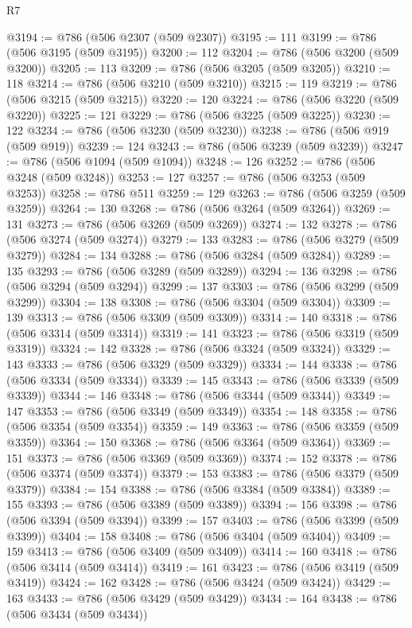 \begin{lexlean}{R7}
\begin{coremodule}
@3194 := @786 (@506 @2307 (@509 @2307))
@3195 := 111
@3199 := @786 (@506 @3195 (@509 @3195))
@3200 := 112
@3204 := @786 (@506 @3200 (@509 @3200))
@3205 := 113
@3209 := @786 (@506 @3205 (@509 @3205))
@3210 := 118
@3214 := @786 (@506 @3210 (@509 @3210))
@3215 := 119
@3219 := @786 (@506 @3215 (@509 @3215))
@3220 := 120
@3224 := @786 (@506 @3220 (@509 @3220))
@3225 := 121
@3229 := @786 (@506 @3225 (@509 @3225))
@3230 := 122
@3234 := @786 (@506 @3230 (@509 @3230))
@3238 := @786 (@506 @919 (@509 @919))
@3239 := 124
@3243 := @786 (@506 @3239 (@509 @3239))
@3247 := @786 (@506 @1094 (@509 @1094))
@3248 := 126
@3252 := @786 (@506 @3248 (@509 @3248))
@3253 := 127
@3257 := @786 (@506 @3253 (@509 @3253))
@3258 := @786 @511
@3259 := 129
@3263 := @786 (@506 @3259 (@509 @3259))
@3264 := 130
@3268 := @786 (@506 @3264 (@509 @3264))
@3269 := 131
@3273 := @786 (@506 @3269 (@509 @3269))
@3274 := 132
@3278 := @786 (@506 @3274 (@509 @3274))
@3279 := 133
@3283 := @786 (@506 @3279 (@509 @3279))
@3284 := 134
@3288 := @786 (@506 @3284 (@509 @3284))
@3289 := 135
@3293 := @786 (@506 @3289 (@509 @3289))
@3294 := 136
@3298 := @786 (@506 @3294 (@509 @3294))
@3299 := 137
@3303 := @786 (@506 @3299 (@509 @3299))
@3304 := 138
@3308 := @786 (@506 @3304 (@509 @3304))
@3309 := 139
@3313 := @786 (@506 @3309 (@509 @3309))
@3314 := 140
@3318 := @786 (@506 @3314 (@509 @3314))
@3319 := 141
@3323 := @786 (@506 @3319 (@509 @3319))
@3324 := 142
@3328 := @786 (@506 @3324 (@509 @3324))
@3329 := 143
@3333 := @786 (@506 @3329 (@509 @3329))
@3334 := 144
@3338 := @786 (@506 @3334 (@509 @3334))
@3339 := 145
@3343 := @786 (@506 @3339 (@509 @3339))
@3344 := 146
@3348 := @786 (@506 @3344 (@509 @3344))
@3349 := 147
@3353 := @786 (@506 @3349 (@509 @3349))
@3354 := 148
@3358 := @786 (@506 @3354 (@509 @3354))
@3359 := 149
@3363 := @786 (@506 @3359 (@509 @3359))
@3364 := 150
@3368 := @786 (@506 @3364 (@509 @3364))
@3369 := 151
@3373 := @786 (@506 @3369 (@509 @3369))
@3374 := 152
@3378 := @786 (@506 @3374 (@509 @3374))
@3379 := 153
@3383 := @786 (@506 @3379 (@509 @3379))
@3384 := 154
@3388 := @786 (@506 @3384 (@509 @3384))
@3389 := 155
@3393 := @786 (@506 @3389 (@509 @3389))
@3394 := 156
@3398 := @786 (@506 @3394 (@509 @3394))
@3399 := 157
@3403 := @786 (@506 @3399 (@509 @3399))
@3404 := 158
@3408 := @786 (@506 @3404 (@509 @3404))
@3409 := 159
@3413 := @786 (@506 @3409 (@509 @3409))
@3414 := 160
@3418 := @786 (@506 @3414 (@509 @3414))
@3419 := 161
@3423 := @786 (@506 @3419 (@509 @3419))
@3424 := 162
@3428 := @786 (@506 @3424 (@509 @3424))
@3429 := 163
@3433 := @786 (@506 @3429 (@509 @3429))
@3434 := 164
@3438 := @786 (@506 @3434 (@509 @3434))

\end{coremodule}
\end{lexlean}
